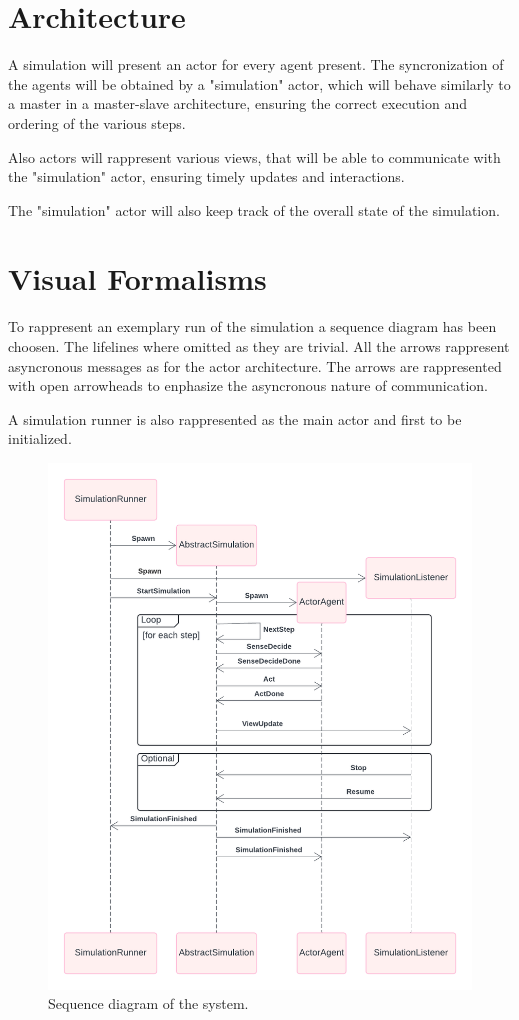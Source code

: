 \documentclass[12pt, a4paper]{report}
\begin{document}
\section{Architecture}
A simulation will present an actor for every agent present. The syncronization of the agents will be obtained by a "simulation" actor,
 which will behave similarly to a master in a master-slave architecture, ensuring the correct execution and ordering of the various steps.

Also actors will rappresent various views, that will be able to communicate with the "simulation" actor, ensuring timely updates and interactions.

The "simulation" actor will also keep track of the overall state of the simulation.
\section{Visual Formalisms}

To rappresent an exemplary run of the simulation a sequence diagram has been choosen. The lifelines where omitted as they are trivial. All the arrows
 rappresent asyncronous messages as for the actor architecture. The arrows are rappresented with open arrowheads to enphasize the asyncronous nature of
 communication.

A simulation runner is also rappresented as the main actor and first to be initialized.

\begin{figure}
    \centering
    \includegraphics{actorsSD.png}
    \caption{Sequence diagram of the system.}
\end{figure}
\end{document}
